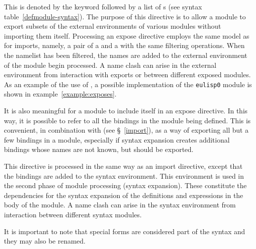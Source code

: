\begin{optDefinition}
%
This is denoted by the keyword  followed by a list of
s (see syntax table~\ref{defmodule-syntax}).  The
purpose of this directive is to allow a module to export subsets of the external
environments of various modules without importing them itself.  Processing an
expose directive employs the same model as for imports, namely, a pair of a
 and a  with the same filtering operations.
When the namelist has been filtered, the names are added to the external
environment of the module begin processed.  A name clash can arise in the
external environment from interaction with exports or between different exposed
modules.  As an example of the use of , a possible
implementation of the {\tt eulisp0} 
module is shown in example~\ref{example:exposes}.
%
\begin{example}
\label{example:exposes}
\end{example}
%
It is also meaningful for a module to include itself in an expose
directive.  In this way, it is possible to refer to all the bindings
in the module being defined.  This is convenient, in combination with
 (see \S~\ref{import}), as a way of exporting all but
a few bindings in a module, especially if syntax expansion creates
additional bindings whose names are not known, but should be exported.
\end{optDefinition}
%
\label{syntax-directive}
\begin{optDefinition}
This directive is processed in the same way as an import directive,
except that the bindings are added to the syntax environment.  This
environment is used in the second phase of module processing (syntax
expansion).  These constitute the dependencies for the syntax expansion
of the definitions and expressions in the body of the module.  A name
clash can arise in the syntax environment from interaction between
different syntax modules.

It is important to note that special forms are considered part of the
syntax and they may also be renamed.
\end{optDefinition}


